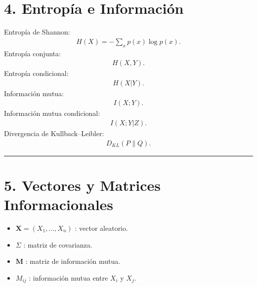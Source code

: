 \documentclass[letterpaper,10pt,english]{jupyterBook}
\begin{document}
\section{4. Entropía e Información}
\label{\detokenize{00_frontmatter/notation:entropia-e-informacion}}
\sphinxAtStartPar
Entropía de Shannon:
\begin{equation*}
\begin{split}
H(X) = -\sum_x p(x)\log p(x).
\end{split}
\end{equation*}
\sphinxAtStartPar
Entropía conjunta:
\begin{equation*}
\begin{split}
H(X,Y).
\end{split}
\end{equation*}
\sphinxAtStartPar
Entropía condicional:
\begin{equation*}
\begin{split}
H(X|Y).
\end{split}
\end{equation*}
\sphinxAtStartPar
Información mutua:
\begin{equation*}
\begin{split}
I(X;Y).
\end{split}
\end{equation*}
\sphinxAtStartPar
Información mutua condicional:
\begin{equation*}
\begin{split}
I(X;Y|Z).
\end{split}
\end{equation*}
\sphinxAtStartPar
Divergencia de Kullback–Leibler:
\begin{equation*}
\begin{split}
D_{KL}(P\|Q).
\end{split}
\end{equation*}

\bigskip\hrule\bigskip



\section{5. Vectores y Matrices Informacionales}
\label{\detokenize{00_frontmatter/notation:vectores-y-matrices-informacionales}}\begin{itemize}
\item {} 
\sphinxAtStartPar
\(\mathbf{X} = (X_1,\dots,X_n)\) : vector aleatorio.

\item {} 
\sphinxAtStartPar
\(\Sigma\) : matriz de covarianza.

\item {} 
\sphinxAtStartPar
\(\mathbf{M}\) : matriz de información mutua.

\item {} 
\sphinxAtStartPar
\(M_{ij}\) : información mutua entre \(X_i\) y \(X_j\).

\end{itemize}
\end{document}
